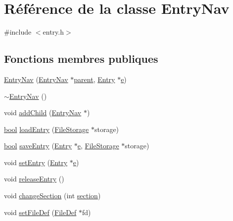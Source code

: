 \hypertarget{class_entry_nav}{}\section{Référence de la classe Entry\+Nav}
\label{class_entry_nav}


{\ttfamily \#include $<$entry.\+h$>$}

\subsection*{Fonctions membres publiques}
\begin{DoxyCompactItemize}
\item 
\hyperlink{class_entry_nav_a778223f04da2618c47b697d33d10559d}{Entry\+Nav} (\hyperlink{class_entry_nav}{Entry\+Nav} $\ast$\hyperlink{class_entry_nav_ad81958481115dc8d88c74756d8278c5f}{parent}, \hyperlink{class_entry}{Entry} $\ast$\hyperlink{060__command__switch_8tcl_aff65a51a703804e0ad1adbcfd76c86f8}{e})
\item 
\hyperlink{class_entry_nav_a146c0cb4e53cf34eafae961189be08a7}{$\sim$\+Entry\+Nav} ()
\item 
void \hyperlink{class_entry_nav_af988d3085b14c1fa584d934a31a1e494}{add\+Child} (\hyperlink{class_entry_nav}{Entry\+Nav} $\ast$)
\item 
\hyperlink{qglobal_8h_a1062901a7428fdd9c7f180f5e01ea056}{bool} \hyperlink{class_entry_nav_ae8baa4eaf2eca2a813110c5272fba763}{load\+Entry} (\hyperlink{class_file_storage}{File\+Storage} $\ast$storage)
\item 
\hyperlink{qglobal_8h_a1062901a7428fdd9c7f180f5e01ea056}{bool} \hyperlink{class_entry_nav_a51daafd4189df04bf0df6504b3c4b1f5}{save\+Entry} (\hyperlink{class_entry}{Entry} $\ast$\hyperlink{060__command__switch_8tcl_aff65a51a703804e0ad1adbcfd76c86f8}{e}, \hyperlink{class_file_storage}{File\+Storage} $\ast$storage)
\item 
void \hyperlink{class_entry_nav_a935101b752fb22f735e62b83721f325c}{set\+Entry} (\hyperlink{class_entry}{Entry} $\ast$\hyperlink{060__command__switch_8tcl_aff65a51a703804e0ad1adbcfd76c86f8}{e})
\item 
void \hyperlink{class_entry_nav_a1475c94b8cb03e8731d852190b8efc64}{release\+Entry} ()
\item 
void \hyperlink{class_entry_nav_aa9d8db3a7fb50142d976111658e7c2f8}{change\+Section} (int \hyperlink{class_entry_nav_a20d879ec204d36042d7e4da2294a7567}{section})
\item 
void \hyperlink{class_entry_nav_a527cd33c59bd801382b73f26a42e2b64}{set\+File\+Def} (\hyperlink{class_file_def}{File\+Def} $\ast$fd)

\end{DoxyCompactItemize}
